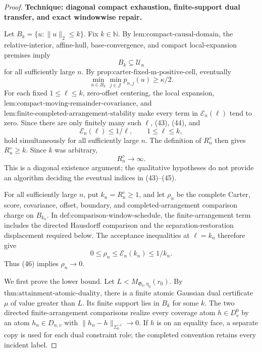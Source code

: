 \documentclass{article}
\begin{document}
\begin{proof}
\textbf{Technique: diagonal compact exhaustion, finite-support dual transfer, and exact windowwise repair.}

Let \(B_k=\{u:\|u\|_2\le k\}\).  Fix \(k\in\mathbb N\).  By \(\text{lem:compact-causal-domain}\), the relative-interior, affine-hull, base-convergence, and compact local-expansion premises imply
\[
 B_k\subseteq\mathcal U_n
 \tag{43}
\]
for all sufficiently large \(n\).  By \(\text{prop:carter-fixed-m-positive-cell}\), eventually
\[
 \min_{u\in B_k}\min_{j\in\mathcal J}p_{n,j}(u)\ge\kappa/2.
 \tag{44}
\]
For each fixed \(1\le\ell\le k\), zero-offset centering, the local expansion, \(\text{lem:compact-moving-remainder-covariance}\), and \(\text{lem:finite-completed-arrangement-stability}\) make every term in \(\mathscr E_n(\ell)\) tend to zero.  Since there are only finitely many such \(\ell\), (43), (44), and
\[
 \mathscr E_n(\ell)\le1/\ell,
 \qquad 1\le\ell\le k,
 \tag{45}
\]
hold simultaneously for all sufficiently large \(n\).  The definition of \(R_n^{\diamond}\) then gives \(R_n^{\diamond}\ge k\).  Since \(k\) was arbitrary,
\[
 R_n^{\diamond}\longrightarrow\infty.
 \tag{46}
\]
This is a diagonal existence argument; the qualitative hypotheses do not provide an algorithm deciding the eventual indices in (43)--(45).

For all sufficiently large \(n\), put \(k_n=R_n^{\diamond}\ge1\), and let \(\rho_n\) be the complete Carter, score, covariance, offset, boundary, and completed-arrangement comparison charge on \(B_{k_n}\).  In \(\text{def:comparison-window-schedule}\), the finite-arrangement term includes the directed Hausdorff comparison and the separation-restoration displacement required below.  The acceptance inequalities at \(\ell=k_n\) therefore give
\[
 0\le\rho_n\le\mathscr E_n(k_n)\le1/k_n.
 \tag{47}
\]
Thus (46) implies \(\rho_n\to0\).

We first prove the lower bound.  Let \(L<M_{\mathfrak G_0,\eta_0}(r_0)\).  By \(\text{thm:attainment-atomic-duality}\), there is a finite atomic Gaussian dual certificate \(\mu\) of value greater than \(L\).  Its finite support lies in \(B_k\) for some \(k\).  The two directed finite-arrangement comparisons realize every coverage atom \(h\in D_v^0\) by an atom \(h_n\in D_{n,v}\) with \(\|h_n-h\|_{\Sigma_0^{-1}}\to0\).  If \(h\) is on an equality face, a separate copy is used for each dual constraint role; the completed convention retains every incident label.


\end{proof}
\end{document}
